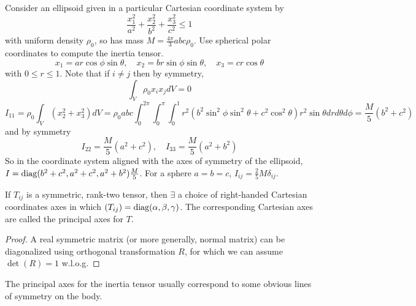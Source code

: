 \documentclass[a4paper]{article}
\begin{document}
\begin{eg}
Consider an ellipsoid given in a particular Cartesian coordinate system by
$$\frac{x_1^2}{a^2}+\frac{x_2^2}{b^2}+\frac{x_3^2}{c^2}\leq 1$$
with uniform density $\rho_0$, so has mass $M=\frac{4\pi}{3}abc\rho_0$. Use spherical polar coordinates to compute the inertia tensor.
$$x_1=ar\cos\phi\sin\theta,\quad x_2=br\sin\phi\sin\theta,\quad x_3=cr\cos\theta$$
with $0\leq r\leq 1$. Note that if $i\neq j$ then by symmetry,
$$\int_V\rho_0x_ix_jdV=0$$
$$I_{11}=\rho_0\int_V(x_2^2+x_3^2)dV=\rho_0abc\int_0^{2\pi}\int_0^\pi\int_0^1r^2(b^2\sin^2\phi\sin^2\theta+c^2\cos^2\theta)r^2\sin\theta drd\theta d\phi=\frac{M}{5}(b^2+c^2)$$
and by symmetry
$$I_{22}=\frac{M}{5}(a^2+c^2),\quad I_{33}=\frac{M}{5}(a^2+b^2)$$
So in the coordinate system aligned with the axes of symmetry of the ellipsoid, $I=\operatorname{diag}(b^2+c^2,a^2+c^2,a^2+b^2)\frac{M}{5}$. For a sphere $a=b=c$, $I_{ij}=\frac{2}{5}M\delta_{ij}$.
\end{eg}
\begin{prop}
If $T_{ij}$ is a symmetric, rank-two tensor, then $\exists$ a choice of right-handed Cartesian coordinates axes in which $(T_{ij})=\operatorname{diag}(\alpha,\beta,\gamma)$. The corresponding Cartesian axes are called the principal axes for $T$.
\end{prop}
\begin{proof}
A real symmetric matrix (or more generally, normal matrix) can be diagonalized using orthogonal transformation $R$, for which we can assume $\det(R)=1$ w.l.o.g.
\end{proof}
The principal axes for the inertia tensor usually correspond to some obvious lines of symmetry on the body.
\newpage
\end{document}
